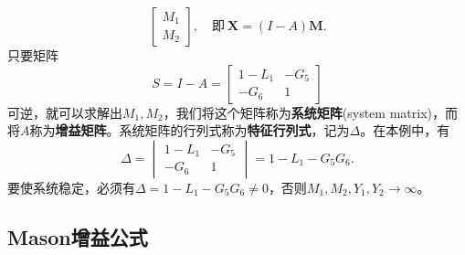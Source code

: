 \begin{example}
\begin{equation}
\begin{bmatrix}
            M_1 \\
            M_2
        \end{bmatrix},\quad\text{即}\ \mathbf{X}=(I-A)\mathbf{M}.
    \end{equation}
    只要矩阵
    \begin{equation}
        S=I-A=\begin{bmatrix}
            1 -L_1 & -G_5\\
            -G_6 & 1
        \end{bmatrix}
    \end{equation}
    可逆，就可以求解出$M_1,M_2$，我们将这个矩阵称为\textbf{系统矩阵}(system matrix)，而将$A$称为\textbf{增益矩阵}。系统矩阵的行列式称为\textbf{特征行列式}，记为$\Delta$。在本例中，有
    \begin{equation}
        \Delta=\begin{vmatrix}
            1 -L_1 & -G_5 \\
            -G_6 & 1
        \end{vmatrix}=1-L_1-G_5 G_6.
    \end{equation}
    要使系统稳定，必须有$\Delta=1-L_1-G_5 G_6\neq 0$，否则$M_1,M_2,Y_1,Y_2\to\infty$。
\end{example}

\subsection{Mason增益公式}\label{sub:mason_gain}

